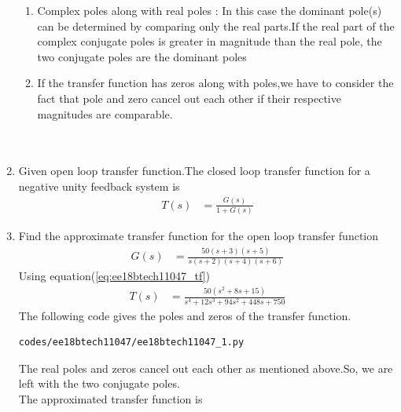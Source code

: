 \begin{enumerate}[label=\thesubsection.\arabic*.,ref=\thesubsection.\theenumi]
\begin{enumerate}
\item Complex poles along with real poles : In this case the dominant pole(s) can be determined by comparing only the real parts.If the real part of the complex conjugate poles is greater in magnitude than the real pole, the two conjugate poles are the dominant poles
\item If the transfer function has zeros along with poles,we have to consider the fact that pole and zero cancel out each other if their respective magnitudes are comparable.
\\
\\
\\
\end{enumerate}

\item 
\begin{figure}[!ht]
	\begin{center}
		\resizebox{\columnwidth}{!}{}
	\end{center}
\caption{}
\label{fig:ee18btech11047}
\end{figure}
Given open loop transfer function.The closed loop transfer function for a negative unity feedback system is
\begin{align}
T(s) &= \frac{G(s)}{1+G(s)} \label{eq:ee18btech11047_tf}
\end{align}
\item Find the approximate transfer function for the open loop transfer function
\begin{align}
G(s) &= \frac{50(s+3)(s+5)}{s(s+2)(s+4)(s+6)} \label{eq:ee18btech11047_1}
\end{align}
\solution Using equation(\ref{eq:ee18btech11047_tf})
\begin{align}
T(s) &= \frac{50(s^{2}+8s+15)}{s^4+12s^3+94s^2+448s+750} \label{eq:ee18btech11047_tf1}
\end{align}
The following code gives the poles and zeros of the transfer function.
\begin{lstlisting}
codes/ee18btech11047/ee18btech11047_1.py
\end{lstlisting}
\begin{table}[!ht]
\centering

\caption{}
\label{table:ee18btech11047}
\end{table}
The real poles  and zeros  cancel out each other as mentioned above.So, we are left with the two conjugate poles.\\
The approximated transfer function is 

\end{enumerate}
